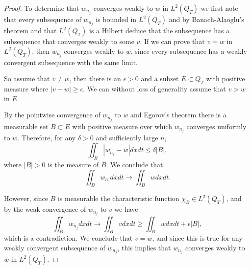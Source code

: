 \documentclass[11pt, a4paper]{article}
\begin{document}
\begin{proof}
	To determine that $w_{n_j}$ converges weakly to $w$ in $L^2(Q_T)$ we first note that every subsequence of $w_{n_j}$ is bounded in $L^2(Q_T)$ and by Banach-Alaoglu's theorem and that $L^2(Q_T)$ is a Hilbert deduce that the subsequence has a subsequence that converges weakly to some $v$. If we can prove that $v=w$ in $L^2(Q_T)$, then $w_{n_j}$ converges weakly to $w$, since every subsequence has a weakly convergent subsequence with the same limit.
	
	So assume that $v\neq w$, then there is an $\epsilon > 0$ and a subset $E\subset Q_T$ with positive measure where $|v-w| \geq \epsilon$. We can without loss of generality assume that $v > w$ in $E$.
	
	By the pointwise convergence of $w_{n_j}$ to $w$ and Egorov's theorem \citep[p. 120]{weiss1999course}	
	there is a measurable set $B\subset E$ with positive measure over which $w_{n_j}$ converges uniformly to $w$. Therefore, for any $\delta > 0$ and sufficiently large $n$,
	\begin{equation*}
	\iint_B |w_{n_j}-w|dxdt \leq \delta |B|,
	\end{equation*}
	where $|B|>0$ is the measure of $B$. We conclude that
	\begin{equation*}
	\iint_B w_{n_j}dxdt \to \iint_B wdxdt.
	\end{equation*}
	
	However, since $B$ is measurable the characteristic function $\chi_B \in L^2(Q_T)$, and by the weak convergence of $w_{n_j}$ to $v$ we have
	\begin{equation*}
	\iint_B w_{n_j}dxdt \to \iint_B vdxdt \geq \iint_B wdxdt + \epsilon|B|,
	\end{equation*}
	which is a contradiction. We conclude that $v=w$, and since this is true for any weakly convergent subsequence of $w_{n_j}$, this implies that $w_{n_j}$ converges weakly to $w$ in $L^2(Q_T)$.
\end{proof}
\end{document}
